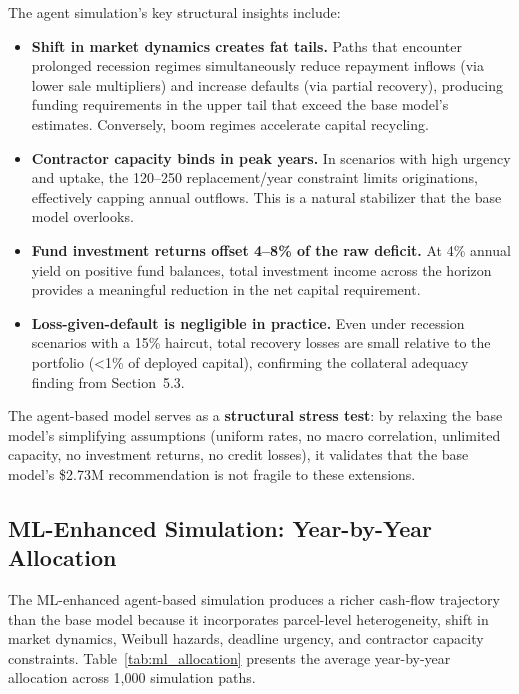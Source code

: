 \documentclass[11pt, letterpaper]{article}
\begin{document}
The agent simulation's key structural insights include:

\begin{itemize}[nosep]
  \item \textbf{Shift in market dynamics creates fat tails.} Paths that encounter prolonged recession regimes simultaneously reduce repayment inflows (via lower sale multipliers) and increase defaults (via partial recovery), producing funding requirements in the upper tail that exceed the base model's estimates. Conversely, boom regimes accelerate capital recycling.
  \item \textbf{Contractor capacity binds in peak years.} In scenarios with high urgency and uptake, the 120--250 replacement/year constraint limits originations, effectively capping annual outflows. This is a natural stabilizer that the base model overlooks.
  \item \textbf{Fund investment returns offset 4--8\% of the raw deficit.} At 4\% annual yield on positive fund balances, total investment income across the horizon provides a meaningful reduction in the net capital requirement.
  \item \textbf{Loss-given-default is negligible in practice.} Even under recession scenarios with a 15\% haircut, total recovery losses are small relative to the portfolio (\textless 1\% of deployed capital), confirming the collateral adequacy finding from Section~5.3.
\end{itemize}

The agent-based model serves as a \textbf{structural stress test}: by relaxing the base model's simplifying assumptions (uniform rates, no macro correlation, unlimited capacity, no investment returns, no credit losses), it validates that the base model's \$2.73M recommendation is not fragile to these extensions.

\subsection{ML-Enhanced Simulation: Year-by-Year Allocation}

The ML-enhanced agent-based simulation produces a richer cash-flow trajectory than the base model because it incorporates parcel-level heterogeneity, shift in market dynamics, Weibull hazards, deadline urgency, and contractor capacity constraints. Table~\ref{tab:ml_allocation} presents the average year-by-year allocation across 1{,}000 simulation paths.
\end{document}
